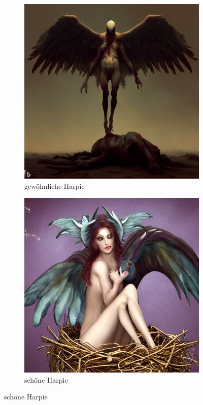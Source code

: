 \documentclass[11pt, twoside]{article}
\begin{document}
\begin{figure}[H]
\begin{subfigure}{0.3\textwidth}
    \includegraphics[width=0.99\linewidth]{harpie2.jpeg}
    \caption{gewöhnliche Harpie}
  \end{subfigure}%
\begin{subfigure}{0.3\textwidth}
    \centering
    \includegraphics[width=0.99\linewidth]{harpie3.jpeg}
    \caption{schöne Harpie}
  \end{subfigure}
\end{figure}
\end{document}
